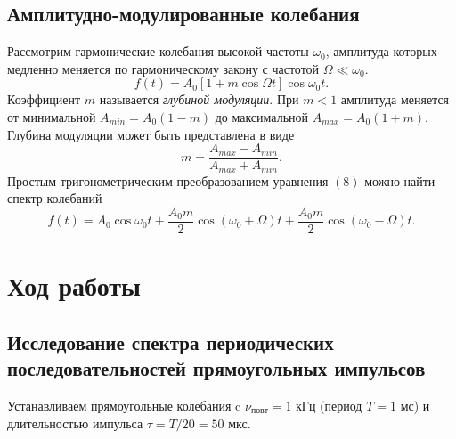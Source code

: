 \documentclass[a4paper, 12pt]{article}%
\begin{document}
	\subsection*{Амплитудно-модулированные колебания}
	
	Рассмотрим гармонические колебания высокой частоты $\omega_0$, амплитуда которых медленно меняется по гармоническому закону с частотой $\Omega \ll \omega_0$.
	\begin{equation}
		f(t) = A_0 \left[1+m\cos \Omega t\right] \cos \omega_0 t.
	\end{equation}
	Коэффициент $m$ называется \textit{глубиной модуляции}. При $m < 1$ амплитуда меняется от минимальной $A_{min} = A_0(1-m)$ до максимальной $A_{max} = A_0(1+m)$. Глубина модуляции может быть представлена в виде
	\begin{equation}
		m = \dfrac{A_{max}-A_{min}}{A_{max}+A_{min}}.
	\end{equation}
	Простым тригонометрическим преобразованием уравнения $(8)$ можно найти спектр колебаний
	\begin{equation}
		f(t) = A_0 \cos \omega_0t + \dfrac{A_0m}{2} \cos \left(\omega_0 + \Omega\right)t + \dfrac{A_0m}{2}\cos\left(\omega_0 - \Omega\right)t.
	\end{equation}
	
	\section{Ход работы}
	\subsection{Исследование спектра периодических последовательностей прямоугольных импульсов}
	Устанавливаем прямоугольные колебания c $\nu_{повт} = 1$ кГц (период $T = 1$ мс) и длительностью импульса $\tau = T/20 = 50$ мкс.
	
\end{document}
